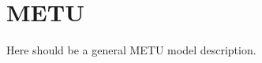 \clearpage
\section{METU\label{sec:METU_models}}

Here should be a general METU model description.



